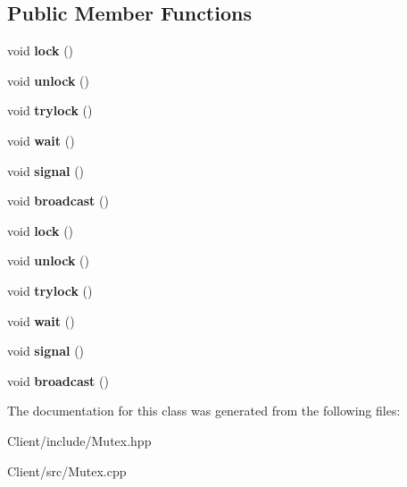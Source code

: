 \subsection*{Public Member Functions}
\begin{DoxyCompactItemize}
\item 
void {\bfseries lock} ()\hypertarget{class_mutex_ad91be808bf0a60a16f10b897ec246d3a}{}\label{class_mutex_ad91be808bf0a60a16f10b897ec246d3a}

\item 
void {\bfseries unlock} ()\hypertarget{class_mutex_a546a5b797ba29959357586aa2b3740a8}{}\label{class_mutex_a546a5b797ba29959357586aa2b3740a8}

\item 
void {\bfseries trylock} ()\hypertarget{class_mutex_ac426ec1f42ccd8b94118ce047c876bf7}{}\label{class_mutex_ac426ec1f42ccd8b94118ce047c876bf7}

\item 
void {\bfseries wait} ()\hypertarget{class_mutex_a70e3b0177eeb334bf8e7d42fa3edcc38}{}\label{class_mutex_a70e3b0177eeb334bf8e7d42fa3edcc38}

\item 
void {\bfseries signal} ()\hypertarget{class_mutex_aa1d3e908c776046ace50916fa6a3681f}{}\label{class_mutex_aa1d3e908c776046ace50916fa6a3681f}

\item 
void {\bfseries broadcast} ()\hypertarget{class_mutex_ac0b8f4eb0539f6e6f71e0cdebf0ac947}{}\label{class_mutex_ac0b8f4eb0539f6e6f71e0cdebf0ac947}

\item 
void {\bfseries lock} ()\hypertarget{class_mutex_ad91be808bf0a60a16f10b897ec246d3a}{}\label{class_mutex_ad91be808bf0a60a16f10b897ec246d3a}

\item 
void {\bfseries unlock} ()\hypertarget{class_mutex_a546a5b797ba29959357586aa2b3740a8}{}\label{class_mutex_a546a5b797ba29959357586aa2b3740a8}

\item 
void {\bfseries trylock} ()\hypertarget{class_mutex_ac426ec1f42ccd8b94118ce047c876bf7}{}\label{class_mutex_ac426ec1f42ccd8b94118ce047c876bf7}

\item 
void {\bfseries wait} ()\hypertarget{class_mutex_a70e3b0177eeb334bf8e7d42fa3edcc38}{}\label{class_mutex_a70e3b0177eeb334bf8e7d42fa3edcc38}

\item 
void {\bfseries signal} ()\hypertarget{class_mutex_aa1d3e908c776046ace50916fa6a3681f}{}\label{class_mutex_aa1d3e908c776046ace50916fa6a3681f}

\item 
void {\bfseries broadcast} ()\hypertarget{class_mutex_ac0b8f4eb0539f6e6f71e0cdebf0ac947}{}\label{class_mutex_ac0b8f4eb0539f6e6f71e0cdebf0ac947}

\end{DoxyCompactItemize}


The documentation for this class was generated from the following files\+:\begin{DoxyCompactItemize}
\item 
Client/include/Mutex.\+hpp\item 
Client/src/Mutex.\+cpp\end{DoxyCompactItemize}
